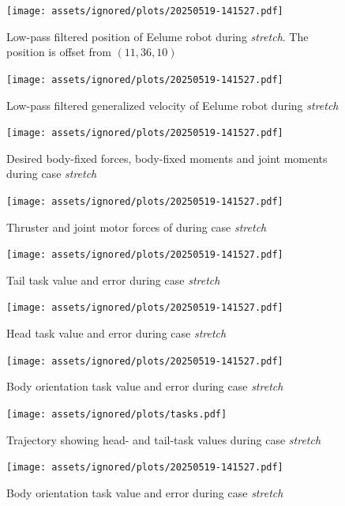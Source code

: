 \begin{figure}[!ht]
    \centering
    \texttt{[image: assets/ignored/plots/20250519-141527.pdf]}
    \caption[Low-pass filtered position of Eelume robot during \textit{stretch} case with \gls{tpc}]
    {Low-pass filtered position of Eelume robot during \textit{stretch}. The position is offset from \((11, 36, 10)\)}
    \label{fig:results:tpc:stretch:1:pos}
\end{figure}
\begin{figure}[!ht]
    \centering
    \texttt{[image: assets/ignored/plots/20250519-141527.pdf]}
    \caption{Low-pass filtered generalized velocity of Eelume robot during \textit{stretch}}
    \label{fig:results:tpc:stretch:1:vel}
\end{figure}
\begin{figure}[!ht]
    \centering
    \texttt{[image: assets/ignored/plots/20250519-141527.pdf]}
    \caption{Desired body-fixed forces, body-fixed moments and joint moments during case \textit{stretch}}
    \label{fig:results:tpc:stretch:1:forces}
\end{figure}
\begin{figure}[!ht]
    \centering
    \texttt{[image: assets/ignored/plots/20250519-141527.pdf]}
    \caption{Thruster and joint motor forces of during case \textit{stretch}}
    \label{fig:results:tpc:stretch:1:forces-torques}
\end{figure}
\begin{figure}[!ht]
    \centering
    \texttt{[image: assets/ignored/plots/20250519-141527.pdf]}
    \caption{Tail task value and error during case \textit{stretch}}
    \label{fig:results:tpc:stretch:1:task:1}
\end{figure}
\begin{figure}[!ht]
    \centering
    \texttt{[image: assets/ignored/plots/20250519-141527.pdf]}
    \caption{Head task value and error during case \textit{stretch}}
    \label{fig:results:tpc:stretch:1:task:2}
\end{figure}
\begin{figure}[!ht]
    \centering
    \texttt{[image: assets/ignored/plots/20250519-141527.pdf]}
    \caption{Body orientation task value and error during case \textit{stretch}}
    \label{fig:results:tpc:stretch:1:task:3}
\end{figure}
\begin{figure}[!ht]
    \centering
    \texttt{[image: assets/ignored/plots/tasks.pdf]}
    \caption{Trajectory showing head- and tail-task values during case \textit{stretch}}
    \label{fig:results:tpc:stretch:task-traj}
\end{figure}
\begin{figure}[!ht]
    \centering
    \texttt{[image: assets/ignored/plots/20250519-141527.pdf]}
    \caption{Body orientation task value and error during case \textit{stretch}}
    \label{fig:results:tpc:stretch:dp-tracking}
\end{figure}

